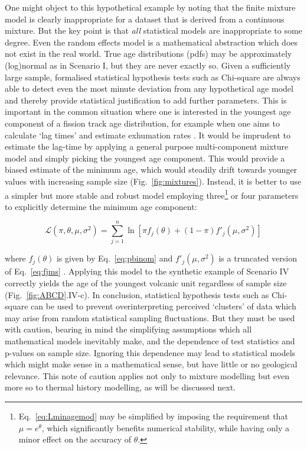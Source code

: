 \documentclass{article}
\begin{document}
One might object to this hypothetical example by noting that the
finite mixture model is clearly inappropriate for a dataset that is
derived from a continuous mixture.  But the key point is that
\emph{all} statistical models are inappropriate to some degree.  Even
the random effects model is a mathematical abstraction which does not
exist in the real world. True age distributions (pdfs) may be
approximately (log)normal as in Scenario I, but they are never exactly
so. Given a sufficiently large sample, formalised statistical
hypothesis tests such as Chi-square are always able to detect even the
most minute deviation from any hypothetical age model and thereby
provide statistical justification to add further parameters.  This is
important in the common situation where one is interested in the
youngest age component of a fission track age distribution, for
example when one aims to calculate `lag times' and estimate exhumation
rates \citep{garver1999,bernet2018}. It would be imprudent to estimate
the lag-time by applying a general purpose multi-component mixture
model and simply picking the youngest age component. This would
provide a biased estimate of the minimum age, which would steadily
drift towards younger values with increasing sample size
(Fig.~\ref{fig:mixtures}).  Instead, it is better to use a simpler but
more stable and robust model employing
three\footnote{Eq.~\ref{eq:Lminagemod} may be simplified by imposing
  the requirement that $\mu=e^{\theta}$, which significantly benefits
  numerical stability, while having only a minor effect on the
  accuracy of $\theta$.}  or four parameters to explicitly determine
the minimum age component:

\begin{equation}
  \mathcal{L}(\pi,\theta,\mu,\sigma^2) =
  \sum\limits_{j=1}^{n} \ln \left[
    \pi f_j(\theta) + (1-\pi) f'_j(\mu,\sigma^2)
    \right]
\label{eq:Lminagemod}
\end{equation}

where $f_j(\theta)$ is given by Eq.~\ref{eq:pbinom} and
$f'_j(\mu,\sigma^2)$ is a truncated version of Eq.~\ref{eq:fjms}
\citep{galbraith1993}. Applying this model to the synthetic example of
Scenario IV correctly yields the age of the youngest volcanic unit
regardless of sample size (Fig.~\ref{fig:ABCD}.IV-c). In conclusion,
statistical hypothesis tests such as Chi-square can be used to prevent
overinterpreting perceived `clusters' of data which may arise from
random statistical sampling fluctuations. But they must be used with
caution, bearing in mind the simplifying assumptions which all
mathematical models inevitably make, and the dependence of test
statistics and p-values on sample size.  Ignoring this dependence may
lead to statistical models which might make sense in a mathematical
sense, but have little or no geological relevance. This note of
caution applies not only to mixture modelling but even more so to
thermal history modelling, as will be discussed next.
\end{document}
